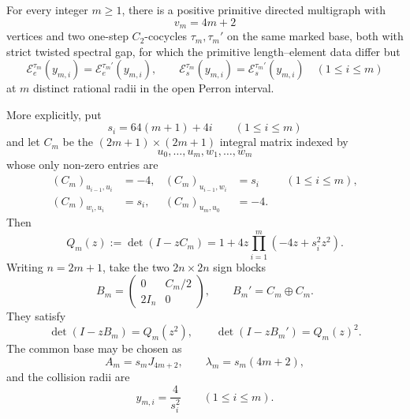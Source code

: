 \begin{theorem}
\label{thm:realizable-linear-multicollisions}
For every integer \(m\ge1\), there is a positive primitive directed
multigraph with
\[
 v_m=4m+2
\]
vertices and two one-step \(C_2\)-cocycles \(\tau_m,\tau_m'\) on the same
marked base, both with strict twisted spectral gap, for which the primitive
length--element data differ but
\begin{equation}\label{eq:realizable-linear-profile-collisions}
 \mathcal E_e^{\tau_m}(y_{m,i})
 =\mathcal E_e^{\tau_m'}(y_{m,i}),\qquad
 \mathcal E_s^{\tau_m}(y_{m,i})
 =\mathcal E_s^{\tau_m'}(y_{m,i})
 \quad(1\le i\le m)
\end{equation}
at \(m\) distinct rational radii in the open Perron interval.

More explicitly, put
\[
 s_i=64(m+1)+4i\qquad(1\le i\le m)
\]
and let \(C_m\) be the \((2m+1)\times(2m+1)\) integral matrix indexed by
\[
 u_0,\ldots,u_m,w_1,\ldots,w_m
\]
whose only non-zero entries are
\begin{equation}\label{eq:realizable-collision-Cm-entries}
 \begin{aligned}
  (C_m)_{u_{i-1},u_i}&=-4,&
  (C_m)_{u_{i-1},w_i}&=s_i &&(1\le i\le m),\\
  (C_m)_{w_i,u_i}&=s_i,&
  (C_m)_{u_m,u_0}&=-4.
 \end{aligned}
\end{equation}
Then
\begin{equation}\label{eq:realizable-collision-Qm}
 Q_m(z):=\det(I-zC_m)
 =1+4z\prod_{i=1}^m(-4z+s_i^2z^2).
\end{equation}
Writing \(n=2m+1\), take the two \(2n\times2n\) sign blocks
\begin{equation}\label{eq:realizable-collision-sign-blocks}
 B_m=\begin{pmatrix}0&C_m/2\\2I_n&0\end{pmatrix},
 \qquad B_m'=C_m\oplus C_m.
\end{equation}
They satisfy
\begin{equation}\label{eq:realizable-collision-determinants}
 \det(I-zB_m)=Q_m(z^2),\qquad
 \det(I-zB_m')=Q_m(z)^2.
\end{equation}
The common base may be chosen as
\[
 A_m=s_mJ_{4m+2},\qquad
 \lambda_m=s_m(4m+2),
\]
and the collision radii are
\begin{equation}\label{eq:realizable-collision-radii}
 y_{m,i}=\frac4{s_i^2}\qquad(1\le i\le m).
\end{equation}
\end{theorem}

